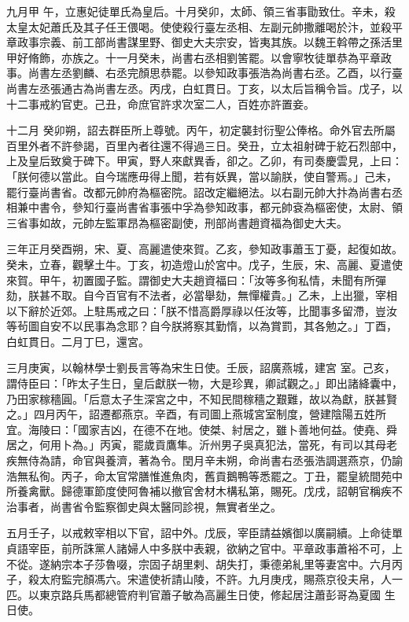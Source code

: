 \begin{pinyinscope}
 九月甲
 午，立惠妃徒單氏為皇后。十月癸卯，太師、領三省事勖致仕。辛未，殺太皇太妃蕭氏及其子任王偎喝。使使殺行臺左丞相、左副元帥撒離喝於汴，並殺平章政事宗義、前工部尚書謀里野、御史大夫宗安，皆夷其族。以魏王斡帶之孫活里甲好脩飾，亦族之。十一月癸未，尚書右丞相劉筈罷。以會寧牧徒單恭為平章政事。尚書左丞劉麟、右丞完顏思恭罷。以參知政事張浩為尚書右丞。乙酉，以行臺尚書左丞張通古為尚書左丞。丙戌，白虹貫日。丁亥，以太后旨稱令旨。戊子，以十二事戒約官吏。己丑，命庶官許求次室二人，百姓亦許置妾。



 十二月
 癸卯朔，詔去群臣所上尊號。丙午，初定襲封衍聖公俸格。命外官去所屬百里外者不許參謁，百里內者往還不得過三日。癸丑，立太祖射碑于紇石烈部中，上及皇后致奠于碑下。甲寅，野人來獻異香，卻之。乙卯，有司奏慶雲見，上曰：「朕何德以當此。自今瑞應毋得上聞，若有妖異，當以諭朕，使自警焉。」己未，罷行臺尚書省。改都元帥府為樞密院。詔改定繼絕法。以右副元帥大抃為尚書右丞相兼中書令，參知行臺尚書省事張中孚為參知政事，都元帥袞為樞密使，太尉、領三省事如故，元帥左監軍昂為樞密副使，刑部尚書趙資福為御史大夫。



 三年正月癸酉朔，宋、夏、高麗遣使來賀。乙亥，參知政事蕭玉丁憂，起復如故。癸未，立春，觀擊土牛。丁亥，初造燈山於宮中。戊子，生辰，宋、高麗、夏遣使來賀。甲午，初置國子監。謂御史大夫趙資福曰：「汝等多徇私情，未聞有所彈劾，朕甚不取。自今百官有不法者，必當舉劾，無憚權貴。」乙未，上出獵，宰相以下辭於近郊。上駐馬戒之曰：「朕不惜高爵厚祿以任汝等，比聞事多留滯，豈汝等茍圖自安不以民事為念耶？自今朕將察其勤惰，以為賞罰，其各勉之。」丁酉，白虹貫日。二月丁巳，還宮。



 三月庚寅，以翰林學士劉長言等為宋生日使。壬辰，詔廣燕城，建宮
 室。己亥，謂侍臣曰：「昨太子生日，皇后獻朕一物，大是珍異，卿試觀之。」即出諸絳囊中，乃田家稼穡圓。「后意太子生深宮之中，不知民間稼穡之艱難，故以為獻，朕甚賢之。」四月丙午，詔遷都燕京。辛酉，有司圖上燕城宮室制度，營建陰陽五姓所宜。海陵曰：「國家吉凶，在德不在地。使桀、紂居之，雖卜善地何益。使堯、舜居之，何用卜為。」丙寅，罷歲貢鷹隼。沂州男子吳真犯法，當死，有司以其母老疾無侍為請，命官與養濟，著為令。閏月辛未朔，命尚書右丞張浩調選燕京，仍諭浩無私徇。丙子，命太官常膳惟進魚肉，舊貢鵝鴨等悉罷之。丁丑，罷皇統間苑中
 所養禽獸。歸德軍節度使阿魯補以撤官舍材木構私第，賜死。戊戌，詔朝官稱疾不治事者，尚書省令監察御史與太醫同診視，無實者坐之。



 五月壬子，以戒敕宰相以下官，詔中外。戊辰，宰臣請益嬪御以廣嗣續。上命徒單貞語宰臣，前所誅黨人諸婦人中多朕中表親，欲納之官中。平章政事蕭裕不可，上不從。遂納宗本子莎魯啜，宗固子胡里剌、胡失打，秉德弟糺里等妻宮中。六月丙子，殺太府監完顏馮六。宋遣使祈請山陵，不許。九月庚戌，賜燕京役夫帛，人一匹。以東京路兵馬都總管府判官蕭子敏為高麗生日使，修起居注蕭彭哥為夏國
 生日使。




\end{pinyinscope}
